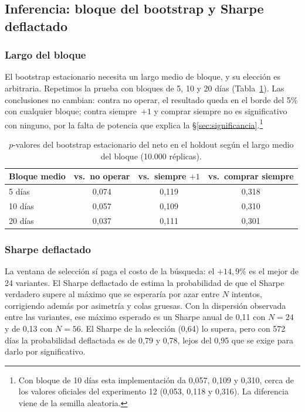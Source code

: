 \documentclass[10pt,a4paper]{article}
\begin{document}
\subsection{Inferencia: bloque del bootstrap y Sharpe deflactado}\label{sec:rob_inferencia}

\subsubsection{Largo del bloque}

El bootstrap estacionario necesita un largo medio de bloque, y su elección es arbitraria.
Repetimos la prueba con bloques de 5, 10 y 20 días (Tabla~\ref{tab:bloques}). Las
conclusiones no cambian: contra no operar, el resultado queda en el borde del 5\% con
cualquier bloque; contra siempre~$+1$ y comprar siempre no es significativo con
ninguno, por la falta de potencia que explica la §\ref{sec:significancia}.\footnote{Con
bloque de 10 días esta implementación da 0,057, 0,109 y 0,310, cerca de los valores
oficiales del experimento 12 (0,053, 0,118 y 0,316). La diferencia viene de la semilla
aleatoria.}

\begin{table}[htb]\centering\small
\begin{tabular}{@{}lccc@{}}
\toprule
Bloque medio & vs.\ no operar & vs.\ siempre $+1$ & vs.\ comprar siempre \\
\midrule
5 días  & 0{,}074 & 0{,}119 & 0{,}318 \\
10 días & 0{,}057 & 0{,}109 & 0{,}310 \\
20 días & 0{,}037 & 0{,}111 & 0{,}301 \\
\bottomrule
\end{tabular}
\caption{$p$-valores del bootstrap estacionario del neto en el holdout según el largo
medio del bloque (10.000 réplicas).}\label{tab:bloques}
\end{table}

\subsubsection{Sharpe deflactado}

La ventana de selección sí paga el costo de la búsqueda: el $+14{,}9\%$ es el mejor de 24
variantes. El Sharpe deflactado de \citet{bailey2014} estima la probabilidad de que el
Sharpe verdadero supere al máximo que se esperaría por azar entre $N$ intentos,
corrigiendo además por asimetría y colas gruesas. Con la dispersión observada entre las
variantes, ese máximo esperado es un Sharpe anual de 0,11 con $N=24$ y de 0,13 con
$N=56$. El Sharpe de la selección (0,64) lo supera, pero con 572 días la probabilidad
deflactada es de 0,79 y 0,78, lejos del 0,95 que se exige para darlo por significativo.
\end{document}
